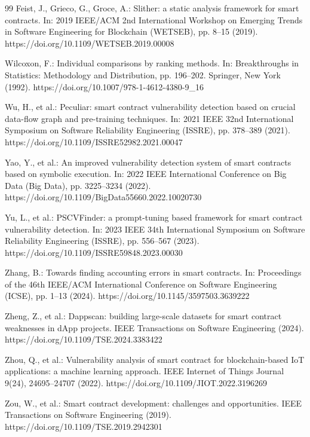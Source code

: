 \documentclass[pdflatex,sn-basic]{sn-jnl}%
\theoremstyle{thmstyleone}%
\theoremstyle{thmstyletwo}%
\theoremstyle{thmstylethree}%
\begin{document}
\begin{thebibliography}{99}
Feist, J., Grieco, G., Groce, A.: Slither: a static analysis framework for smart contracts. In: 2019 IEEE/ACM 2nd
International Workshop on Emerging Trends in Software Engineering for Blockchain (WETSEB), pp. 8--15
(2019). https://doi.org/10.1109/WETSEB.2019.00008


Wilcoxon, F.: Individual comparisons by ranking methods. In: Breakthroughs in Statistics: Methodology and Distribution, pp. 196--202. Springer, New York (1992). https://doi.org/10.1007/978-1-4612-4380-9\_16

Wu, H., et al.: Peculiar: smart contract vulnerability detection based on crucial data-flow graph
and pre-training techniques. In: 2021 IEEE 32nd International Symposium on Software Reliability
Engineering (ISSRE), pp. 378--389 (2021). https://doi.org/10.1109/ISSRE52982.2021.00047

Yao, Y., et al.: An improved vulnerability detection system of smart contracts based on symbolic
execution. In: 2022 IEEE International Conference on Big Data (Big Data), pp. 3225--3234 (2022). https://doi.org/10.1109/BigData55660.2022.10020730

Yu, L., et al.: PSCVFinder: a prompt-tuning based framework for smart contract vulnerability
detection. In: 2023 IEEE 34th International Symposium on Software Reliability Engineering (ISSRE),
pp. 556--567 (2023). https://doi.org/10.1109/ISSRE59848.2023.00030

Zhang, B.: Towards finding accounting errors in smart contracts. In: Proceedings of the 46th IEEE/ACM International Conference on Software Engineering (ICSE), pp. 1--13 (2024). https://doi.org/10.1145/3597503.3639222

Zheng, Z., et al.: Dappscan: building large-scale datasets for smart contract weaknesses in dApp
projects. IEEE Transactions on Software Engineering (2024). https://doi.org/10.1109/TSE.2024.3383422

Zhou, Q., et al.: Vulnerability analysis of smart contract for blockchain-based IoT applications: a
machine learning approach. IEEE Internet of Things Journal 9(24), 24695--24707 (2022). https://doi.org/10.1109/JIOT.2022.3196269

Zou, W., et al.: Smart contract development: challenges and opportunities. IEEE Transactions on
Software Engineering (2019). https://doi.org/10.1109/TSE.2019.2942301

\end{thebibliography}
\end{document}
